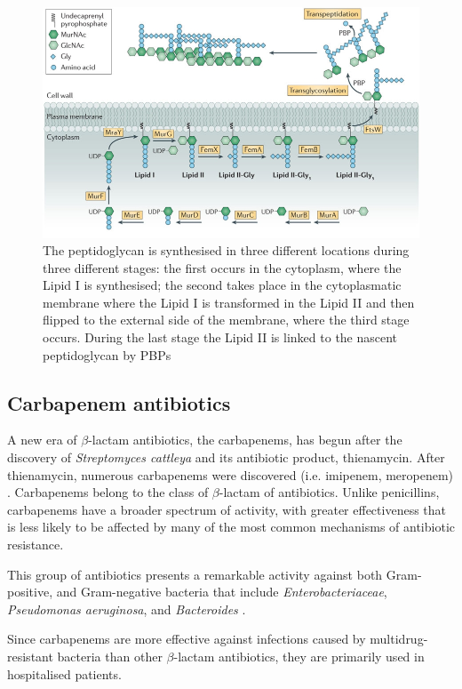 \documentclass[11pt]{report}
\begin{document}
\clearpage
\begin{figure}[htp]
\centering
\includegraphics[scale=0.50]{img/Peptidoglycan.jpg}
\caption{The peptidoglycan is synthesised in three different locations during three different stages: the first occurs in the cytoplasm, where the Lipid I is synthesised; the second takes place in the cytoplasmatic membrane where the Lipid I is transformed in the Lipid II and then flipped to the external side of the membrane, where the third stage occurs.
During the last stage the Lipid II is linked to the nascent peptidoglycan by PBPs \cite{Pinho2013}}
\label{pept}
\end{figure}

\subsection{Carbapenem antibiotics}
A new era of $\beta$-lactam antibiotics, the carbapenems, has begun after the discovery of \emph{Streptomyces cattleya} and its antibiotic product, thienamycin.
After thienamycin, numerous carbapenems were discovered (i.e. imipenem, meropenem) \cite{Birnbaum1985}.
Carbapenems belong to the class of $\beta$-lactam of antibiotics.
Unlike penicillins, carbapenems have a broader spectrum of activity, with greater effectiveness that is less likely to be affected by many of the most common mechanisms of antibiotic resistance.

This group of antibiotics presents a remarkable activity against both Gram-positive, and Gram-negative bacteria that include \emph{Enterobacteriaceae}, \emph{Pseudomonas aeruginosa}, and \emph{Bacteroides} \cite{Neu1985}.

Since carbapenems are more effective against infections caused by multidrug-resistant bacteria than other $\beta$-lactam antibiotics, they are primarily used in hospitalised patients.
\end{document}
